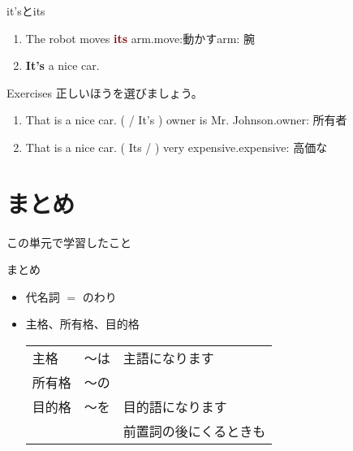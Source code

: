 \documentclass[aspectratio=169,xcolor={dvipsnames,table}]{beamer}
\begin{document}
\begin{frame}[plain]{it'sとits}
\Large
 \begin{enumerate}
  \item The robot moves \textcolor{Maroon}{\bfseries its} arm.\hfill{\scriptsize move:動かす\hspace{1\zw}arm: 腕}
  \item \textcolor{NavyBlue}{\bfseries It's} a nice car.
 \end{enumerate}
\normalsize

\vfill

\end{frame}
\begin{frame}[plain]{Exercises}
 正しいほうを選びましょう。

 \begin{enumerate}
  \item That is a nice car. (  / It's ) owner is Mr. Johnson.\hfill{\scriptsize owner: 所有者}
  \item That is a nice car. (  Its /  ) very expensive.\hfill{\scriptsize expensive: 高価な}
 \end{enumerate}
\end{frame}

\section{まとめ}%
\begin{frame}[plain]{この単元で学習したこと}
\begin{block}{まとめ}

 \begin{itemize}
  \item 代名詞\,\,$=$\,\,のわり
  \item 主格、所有格、目的格%
\hspace{30pt}%
\begin{tabular}[t]{lll}
 主格&〜は&主語になります \\
 所有格&〜の \\
 目的格&〜を&目的語になります \\
 & &前置詞の後にくるときも \\

\end{tabular}
 \end{itemize}

     \end{block}
\end{frame}
\end{document}
